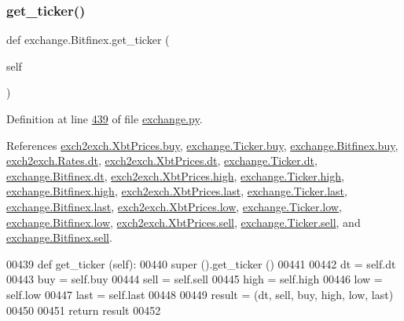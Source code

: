 \subsubsection{\texorpdfstring{get\+\_\+ticker()}{get\_ticker()}}
{\footnotesize\ttfamily def exchange.\+Bitfinex.\+get\+\_\+ticker (\begin{DoxyParamCaption}\item[{}]{self }\end{DoxyParamCaption})}



Definition at line \hyperlink{exchange_8py_source_l00439}{439} of file \hyperlink{exchange_8py_source}{exchange.\+py}.



References \hyperlink{exch2exch_8py_source_l00059}{exch2exch.\+Xbt\+Prices.\+buy}, \hyperlink{exchange_8py_source_l00060}{exchange.\+Ticker.\+buy}, \hyperlink{exchange_8py_source_l00430}{exchange.\+Bitfinex.\+buy}, \hyperlink{exch2exch_8py_source_l00028}{exch2exch.\+Rates.\+dt}, \hyperlink{exch2exch_8py_source_l00057}{exch2exch.\+Xbt\+Prices.\+dt}, \hyperlink{exchange_8py_source_l00059}{exchange.\+Ticker.\+dt}, \hyperlink{exchange_8py_source_l00437}{exchange.\+Bitfinex.\+dt}, \hyperlink{exch2exch_8py_source_l00061}{exch2exch.\+Xbt\+Prices.\+high}, \hyperlink{exchange_8py_source_l00062}{exchange.\+Ticker.\+high}, \hyperlink{exchange_8py_source_l00432}{exchange.\+Bitfinex.\+high}, \hyperlink{exch2exch_8py_source_l00063}{exch2exch.\+Xbt\+Prices.\+last}, \hyperlink{exchange_8py_source_l00064}{exchange.\+Ticker.\+last}, \hyperlink{exchange_8py_source_l00434}{exchange.\+Bitfinex.\+last}, \hyperlink{exch2exch_8py_source_l00062}{exch2exch.\+Xbt\+Prices.\+low}, \hyperlink{exchange_8py_source_l00063}{exchange.\+Ticker.\+low}, \hyperlink{exchange_8py_source_l00433}{exchange.\+Bitfinex.\+low}, \hyperlink{exch2exch_8py_source_l00058}{exch2exch.\+Xbt\+Prices.\+sell}, \hyperlink{exchange_8py_source_l00061}{exchange.\+Ticker.\+sell}, and \hyperlink{exchange_8py_source_l00431}{exchange.\+Bitfinex.\+sell}.


\begin{DoxyCode}
00439     \textcolor{keyword}{def }get\_ticker (self):
00440         super ().get\_ticker ()
00441         
00442         dt   = self.dt
00443         buy  = self.buy
00444         sell = self.sell
00445         high = self.high
00446         low  = self.low
00447         last = self.last
00448         
00449         result = (dt, sell, buy, high, low, last)
00450         
00451         \textcolor{keywordflow}{return} result
00452     
\end{DoxyCode}
\mbox{\label{classexchange_1_1_bitfinex_a698ecb1924ae0f0a97613c3f49463729}} 
